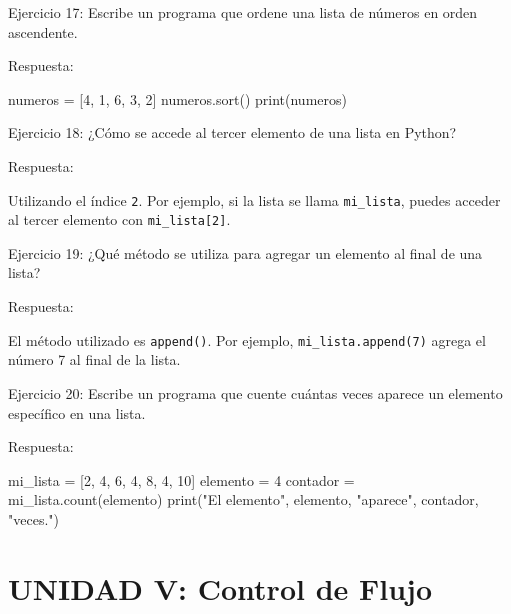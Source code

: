 \documentclass[
  a4paper,
  DIV=11,
  numbers=noendperiod,
  onepage,
  openany]{scrreprt}
\newenvironment{Shaded}{\begin{snugshade}}{\end{snugshade}}
\newcommand{\BuiltInTok}[1]{\textcolor[rgb]{0.00,0.23,0.31}{#1}}
\newcommand{\DecValTok}[1]{\textcolor[rgb]{0.68,0.00,0.00}{#1}}
\newcommand{\NormalTok}[1]{\textcolor[rgb]{0.00,0.23,0.31}{#1}}
\newcommand{\OperatorTok}[1]{\textcolor[rgb]{0.37,0.37,0.37}{#1}}
\newcommand{\StringTok}[1]{\textcolor[rgb]{0.13,0.47,0.30}{#1}}
\begin{document}
Ejercicio 17: Escribe un programa que ordene una lista de números en
orden ascendente.

Respuesta:

\begin{Shaded}
\begin{Highlighting}[]
\NormalTok{numeros }\OperatorTok{=}\NormalTok{ [}\DecValTok{4}\NormalTok{, }\DecValTok{1}\NormalTok{, }\DecValTok{6}\NormalTok{, }\DecValTok{3}\NormalTok{, }\DecValTok{2}\NormalTok{]}
\NormalTok{numeros.sort()}
\BuiltInTok{print}\NormalTok{(numeros)}
\end{Highlighting}
\end{Shaded}

Ejercicio 18: ¿Cómo se accede al tercer elemento de una lista en Python?

Respuesta:

Utilizando el índice \texttt{2}. Por ejemplo, si la lista se llama
\texttt{mi\_lista}, puedes acceder al tercer elemento con
\texttt{mi\_lista{[}2{]}}.

Ejercicio 19: ¿Qué método se utiliza para agregar un elemento al final
de una lista?

Respuesta:

El método utilizado es \texttt{append()}. Por ejemplo,
\texttt{mi\_lista.append(7)} agrega el número 7 al final de la lista.

Ejercicio 20: Escribe un programa que cuente cuántas veces aparece un
elemento específico en una lista.

Respuesta:

\begin{Shaded}
\begin{Highlighting}[]
\NormalTok{mi\_lista }\OperatorTok{=}\NormalTok{ [}\DecValTok{2}\NormalTok{, }\DecValTok{4}\NormalTok{, }\DecValTok{6}\NormalTok{, }\DecValTok{4}\NormalTok{, }\DecValTok{8}\NormalTok{, }\DecValTok{4}\NormalTok{, }\DecValTok{10}\NormalTok{]}
\NormalTok{elemento }\OperatorTok{=} \DecValTok{4}
\NormalTok{contador }\OperatorTok{=}\NormalTok{ mi\_lista.count(elemento)}
\BuiltInTok{print}\NormalTok{(}\StringTok{"El elemento"}\NormalTok{, elemento, }\StringTok{"aparece"}\NormalTok{, contador, }\StringTok{"veces."}\NormalTok{)}
\end{Highlighting}
\end{Shaded}

\section{UNIDAD V: Control de Flujo}\label{unidad-v-control-de-flujo}
\end{document}

